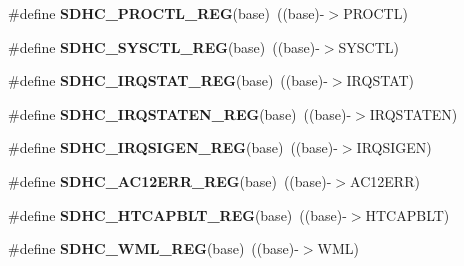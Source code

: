 \begin{DoxyCompactItemize}
\item 
\#define {\bfseries S\+D\+H\+C\+\_\+\+P\+R\+O\+C\+T\+L\+\_\+\+R\+EG}(base)~((base)-\/$>$P\+R\+O\+C\+TL)\hypertarget{group__SDHC__Register__Accessor__Macros_ga386015063027d9a390c0f2209a6827a3}{}\label{group__SDHC__Register__Accessor__Macros_ga386015063027d9a390c0f2209a6827a3}

\item 
\#define {\bfseries S\+D\+H\+C\+\_\+\+S\+Y\+S\+C\+T\+L\+\_\+\+R\+EG}(base)~((base)-\/$>$S\+Y\+S\+C\+TL)\hypertarget{group__SDHC__Register__Accessor__Macros_ga3fc6bad4325e3b66ebfcdee82911dac5}{}\label{group__SDHC__Register__Accessor__Macros_ga3fc6bad4325e3b66ebfcdee82911dac5}

\item 
\#define {\bfseries S\+D\+H\+C\+\_\+\+I\+R\+Q\+S\+T\+A\+T\+\_\+\+R\+EG}(base)~((base)-\/$>$I\+R\+Q\+S\+T\+AT)\hypertarget{group__SDHC__Register__Accessor__Macros_ga4b5e238d4c3181db38f4eb901ca6a80b}{}\label{group__SDHC__Register__Accessor__Macros_ga4b5e238d4c3181db38f4eb901ca6a80b}

\item 
\#define {\bfseries S\+D\+H\+C\+\_\+\+I\+R\+Q\+S\+T\+A\+T\+E\+N\+\_\+\+R\+EG}(base)~((base)-\/$>$I\+R\+Q\+S\+T\+A\+T\+EN)\hypertarget{group__SDHC__Register__Accessor__Macros_gad9da545edf8c07a3c5cf4415a1cbb757}{}\label{group__SDHC__Register__Accessor__Macros_gad9da545edf8c07a3c5cf4415a1cbb757}

\item 
\#define {\bfseries S\+D\+H\+C\+\_\+\+I\+R\+Q\+S\+I\+G\+E\+N\+\_\+\+R\+EG}(base)~((base)-\/$>$I\+R\+Q\+S\+I\+G\+EN)\hypertarget{group__SDHC__Register__Accessor__Macros_ga649b5c6295c4f2f2f2edcf12d8aa2819}{}\label{group__SDHC__Register__Accessor__Macros_ga649b5c6295c4f2f2f2edcf12d8aa2819}

\item 
\#define {\bfseries S\+D\+H\+C\+\_\+\+A\+C12\+E\+R\+R\+\_\+\+R\+EG}(base)~((base)-\/$>$A\+C12\+E\+RR)\hypertarget{group__SDHC__Register__Accessor__Macros_gaad26f27b63f507e04cda527b7217c868}{}\label{group__SDHC__Register__Accessor__Macros_gaad26f27b63f507e04cda527b7217c868}

\item 
\#define {\bfseries S\+D\+H\+C\+\_\+\+H\+T\+C\+A\+P\+B\+L\+T\+\_\+\+R\+EG}(base)~((base)-\/$>$H\+T\+C\+A\+P\+B\+LT)\hypertarget{group__SDHC__Register__Accessor__Macros_gab9b310244dc343d6cbdc1d1b38eff1f4}{}\label{group__SDHC__Register__Accessor__Macros_gab9b310244dc343d6cbdc1d1b38eff1f4}

\item 
\#define {\bfseries S\+D\+H\+C\+\_\+\+W\+M\+L\+\_\+\+R\+EG}(base)~((base)-\/$>$W\+ML)\hypertarget{group__SDHC__Register__Accessor__Macros_ga47fdba7435ca80ea78e3b4f40c93f47a}{}\label{group__SDHC__Register__Accessor__Macros_ga47fdba7435ca80ea78e3b4f40c93f47a}


\end{DoxyCompactItemize}
